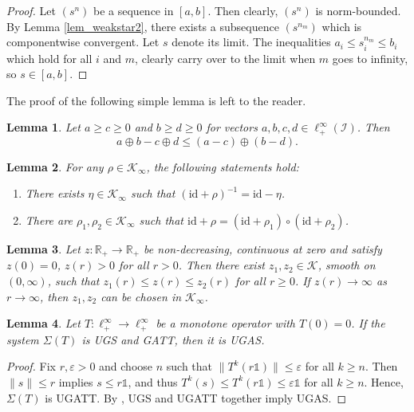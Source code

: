 \documentclass[10pt, oneside, a4paper]{article}
\newcommand{\R}{\mathbb{R}}
\newcommand{\ep}{\varepsilon}
\newcommand{\unit}{\mathds{1}}
\newcommand{\id}{\mathrm{id}}
\newcommand{\IC}{\mathcal{I}}
\newcommand{\KC}{\mathcal{K}}
\newtheorem{lemma}{Lemma}[section]
\begin{document}
\begin{proof}
Let $(s^n)$ be a sequence in $[a,b]$. Then clearly, $(s^n)$ is norm-bounded. By Lemma \ref{lem_weakstar2}, there exists a subsequence $(s^{n_m})$ which is componentwise convergent. Let $s$ denote its limit. The inequalities $a_i \leq s^{n_m}_i \leq b_i$ which hold for all $i$ and $m$, clearly carry over to the limit when $m$ goes to infinity, so $s \in [a,b]$.
\end{proof}

The proof of the following simple lemma is left to the reader.%

\begin{lemma}\label{lem_maxdiff}
Let $a \geq c \geq 0$ and $b \geq d \geq 0$ for vectors $a,b,c,d \in \ell^{\infty}_+(\IC)$. Then%
\begin{equation*}
  a \oplus b - c \oplus d \leq (a - c) \oplus (b - d).%
\end{equation*}
\end{lemma}

\begin{lemma}{\cite[Lem.~A.6]{Mir}}\label{lem_kinfty}
For any $\rho \in \KC_{\infty}$, the following statements hold:%
\begin{enumerate}
\item[(a)] There exists $\eta \in \KC_{\infty}$ such that $(\id + \rho)^{-1} = \id - \eta$.%
\item[(b)] There are $\rho_1,\rho_2 \in \KC_{\infty}$ such that $\id + \rho = (\id + \rho_1) \circ (\id + \rho_2)$.%
\end{enumerate}
\end{lemma}

\begin{lemma}{\cite[Prop.~A.16]{Mir}}\label{lem_mir_A16}
Let $z:\R_+ \rightarrow \R_+$ be non-decreasing, continuous at zero and satisfy $z(0) = 0$, $z(r) > 0$ for all $r > 0$. Then there exist $z_1,z_2 \in \KC$, smooth on $(0,\infty)$, such that $z_1(r) \leq z(r) \leq z_2(r)$ for all $r \geq 0$. If $z(r) \rightarrow \infty$ as $r \rightarrow \infty$, then $z_1,z_2$ can be chosen in $\KC_{\infty}$.
\end{lemma}

\begin{lemma}\label{lem_ugas}
Let $T:\ell^{\infty}_+ \rightarrow \ell^{\infty}_+$ be a monotone operator with $T(0) = 0$. If the system $\Sigma(T)$ is UGS and GATT, then it is UGAS.
\end{lemma}

\begin{proof}
Fix $r,\ep > 0$ and choose $n$ such that $\|T^k(r\unit)\| \leq \ep$ for all $k \geq n$. Then $\|s\| \leq r$ implies $s \leq r\unit$, and thus $T^k(s) \leq T^k(r\unit) \leq \ep\unit$ for all $k \geq n$. Hence, $\Sigma(T)$ is UGATT. By \cite[Thm.~4.2]{Mi2}, UGS and UGATT together imply UGAS.
\end{proof}
\end{document}

